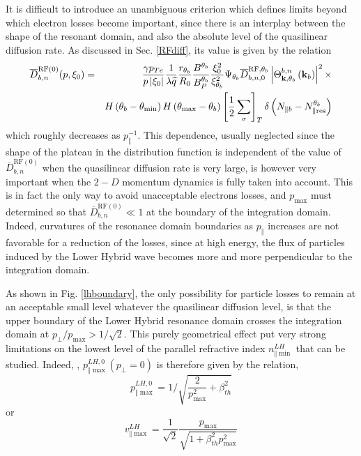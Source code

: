 It is difficult to introduce an unambiguous criterion which defines limits
beyond which electron losses become important, since there is an interplay
between the shape of the resonant domain, and also the absolute level of the
quasilinear diffusion rate. As discussed in Sec. \ref{RFdiff}, its value is
given by the relation
\begin{eqnarray}
\overline{D}_{b,n}^{\text{RF}(0)}(p,\xi _{0}) &=&\frac{\gamma p_{Te}}{%
p\left| \xi _{0}\right| }\frac{1}{\lambda \widetilde{q}}\frac{r_{\theta _{b}}%
}{R_{0}}\frac{B^{\theta _{b}}}{B_{P}^{\theta _{b}}}\frac{\xi _{0}^{2}}{\xi
_{\theta _{b}}^{2}}\Psi _{\theta _{b}}\overline{D}_{b,n,0}^{\text{RF,}\theta
_{b}}\left| \Theta _{\mathbf{k,}\theta _{b}}^{b,n}\left( \mathbf{k}%
_{b}\right) \right| ^{2}\times   \nonumber \\
&&H\left( \theta _{b}-\theta _{\min }\right) H\left( \theta _{\max }-\theta
_{b}\right) \left[ \frac{1}{2}\sum\limits_{\sigma }\right] _{T}\delta \left(
N_{\Vert b}-N_{\Vert \text{res}}^{\theta _{b}}\right)
\end{eqnarray}
which roughly decreases as $p_{\Vert }^{-1}$. This dependence, usually
neglected since the shape of the plateau in the distribution function is
independent of the value of $\overline{D}_{b,n}^{\text{RF}(0)}$ when the
quasilinear diffusion rate is very large, is however very important when the
$2-D$ momentum dynamics is fully taken into account. This is in fact the
only way to avoid unacceptable electrons losses, and $p_{\max }$ must
determined so that $\overline{D}_{b,n}^{\text{RF}(0)}\ll 1$ at the boundary
of the integration domain. Indeed, curvatures of the resonance domain
boundaries as $p_{\Vert }$ increases are not favorable for a reduction of
the losses, since at high energy, the flux of particles induced by the Lower
Hybrid wave becomes more and more perpendicular to the integration domain.

As shown in Fig. \ref{lhboundary}, the only possibility for particle losses
to remain at an acceptable small level whatever the quasilinear diffusion
level, is that the upper boundary of the Lower Hybrid resonance domain
crosses the integration domain at $p_{\bot }/p_{\max }>1/\sqrt{2}.$ This
purely geometrical effect put very strong limitations on the lowest level of
the parallel refractive index $n_{\Vert \min }^{LH}$ that can be studied.
Indeed, , $p_{\Vert \max }^{LH,0}\left( p_{\bot }=0\right) $ is therefore
given by the relation,
\begin{equation}
p_{\Vert \max }^{LH,0}=1/\sqrt{\frac{2}{p_{\max }^{2}}+\beta _{th}^{2}}
\end{equation}
or
\begin{equation}
v_{\Vert \max }^{LH}=\frac{1}{\sqrt{2}}\frac{p_{\max }}{\sqrt{1+\beta
_{th}^{2}p_{\max }^{2}}}
\end{equation}

